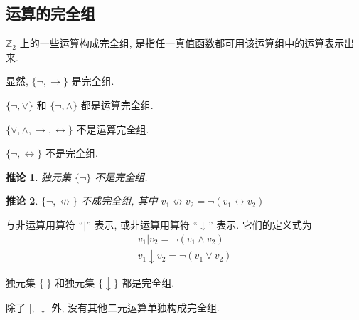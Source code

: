 \documentclass[
    mode=hazy,
    color=blue,
    device=normal,
    lang=cn
]{elegantnote}
\newtheorem{deduction}{推论}[section]
\begin{document}
\subsection{运算的完全组}
\begin{definition}[运算的完全组]
    $\mathbb{Z}_2$ 上的一些运算构成完全组, 是指任一真值函数都可用该运算组中的运算表示出来.
\end{definition}
显然, $\{\lnot,\to\}$ 是完全组.
\begin{proposition}
    $\{\lnot, \lor\}$ 和 $\{\lnot,\land\}$ 都是运算完全组.
\end{proposition}
\begin{proposition}
    $\{\lor,\land,\to,\leftrightarrow\}$ 不是运算完全组.
\end{proposition}
\begin{proposition}
    $\{\lnot,\leftrightarrow\}$ 不是完全组.
\end{proposition}
\begin{deduction}
    独元集 $\{\lnot\}$ 不是完全组.
\end{deduction}
\begin{deduction}
    $\{\lnot,\not\leftrightarrow\}$ 不成完全组, 其中 $v_1\not\leftrightarrow v_2 = \lnot (v_1\leftrightarrow v_2)$
\end{deduction}
\begin{definition}[``与非'' 运算和 ``或非'' 运算]
    与非运算用算符 ``$\vert$'' 表示, 或非运算用算符 ``$\downarrow$'' 表示. 它们的定义式为
    \begin{gather*}
        v_1\vert v_2 = \lnot (v_1\land v_2)\\
        v_1\downarrow v_2 = \lnot (v_1\lor v_2)
    \end{gather*}
\end{definition}
\begin{proposition}
    独元集 $\{\vert\}$ 和独元集 $\{\downarrow\}$ 都是完全组.
\end{proposition}
\begin{proposition}
    除了 $\vert$, $\downarrow$ 外, 没有其他二元运算单独构成完全组.
\end{proposition}
\end{document}
